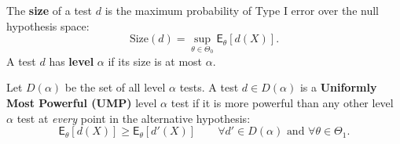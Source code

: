 \begin{definition}
The \textbf{size} of a test $d$ is the maximum probability of Type I error over the null hypothesis space:
\[ \text{Size}(d) = \sup_{\theta \in \Theta_0} \mathsf{E}_{\theta}[d(X)]. \]
A test $d$ has \textbf{level} $\alpha$ if its size is at most $\alpha$.
\end{definition}

\begin{definition}
Let $D(\alpha)$ be the set of all level $\alpha$ tests. A test $d \in D(\alpha)$ is a \textbf{Uniformly Most Powerful (UMP)} level $\alpha$ test if it is more powerful than any other level $\alpha$ test at \textit{every} point in the alternative hypothesis:
\[ \mathsf{E}_{\theta}[d(X)] \ge \mathsf{E}_{\theta}[d'(X)] \qquad \forall d' \in D(\alpha) \text{ and } \forall \theta \in \Theta_1. \]
\end{definition}



